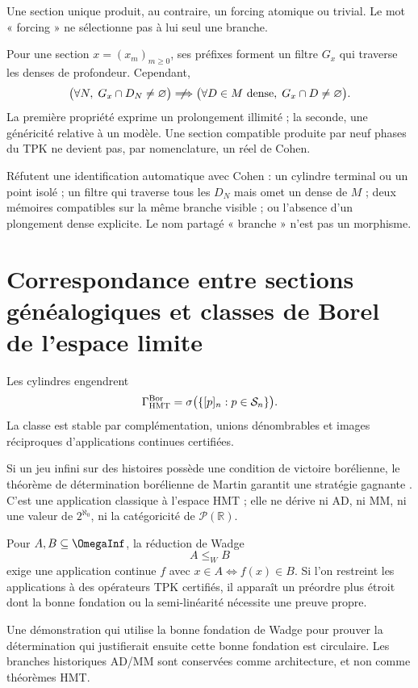 Une section unique produit, au contraire, un forcing atomique ou trivial.
Le mot « forcing » ne sélectionne pas à lui seul une branche.

Pour une section \(x=(x_m)_{m\ge0}\), ses préfixes forment un filtre \(G_x\)
qui traverse les denses de profondeur. Cependant,
\[
  \bigl(\forall N,\;G_x\cap D_N\ne\varnothing\bigr)
  \centernot\Longrightarrow
  \bigl(\forall D\in M\text{ dense},\;G_x\cap D\ne\varnothing\bigr).
\]
La première propriété exprime un prolongement illimité ; la seconde,
une généricité relative à un modèle. Une section compatible produite par
neuf phases du TPK ne devient pas, par nomenclature, un réel de Cohen.

\begin{remark}
Réfutent une identification automatique avec Cohen : un cylindre terminal ou un
point isolé ; un filtre qui traverse tous les \(D_N\) mais omet un
dense de \(M\) ; deux mémoires compatibles sur la même branche visible ; ou
l'absence d'un plongement dense explicite. Le nom partagé « branche » n'est pas
un morphisme.
\end{remark}

\section{Correspondance entre sections généalogiques et classes de Borel de l'espace limite}

Les cylindres engendrent
\[
 \Gamma_{\rm HMT}^{\rm Bor}
 =
 \sigma\bigl(\{[p]_n:p\in\mathcal S_n\}\bigr).
\]
La classe est stable par complémentation, unions dénombrables et images réciproques
d'applications continues certifiées.

Si un jeu infini sur des histoires possède une condition de victoire borélienne,
le théorème de détermination borélienne de Martin garantit une stratégie
gagnante \citep{martin1975}. C'est une application classique à l'espace HMT ;
elle ne dérive ni AD, ni MM, ni une valeur de \(2^{\aleph_0}\), ni la catégoricité de
\(\mathcal P(\mathbb R)\).

Pour \(A,B\subseteq\OmegaInf\), la réduction de Wadge
\[
 A\le_WB
\]
exige une application continue \(f\) avec \(x\in A\iff f(x)\in B\). Si l'on
restreint les applications à des opérateurs TPK certifiés, il apparaît un préordre plus
étroit dont la bonne fondation ou la semi-linéarité nécessite une preuve propre.

\begin{remark}
Une démonstration qui utilise la bonne fondation de Wadge pour prouver la
détermination qui justifierait ensuite cette bonne fondation est circulaire. Les
branches historiques AD/MM sont conservées comme architecture, et non comme théorèmes HMT.
\end{remark}

